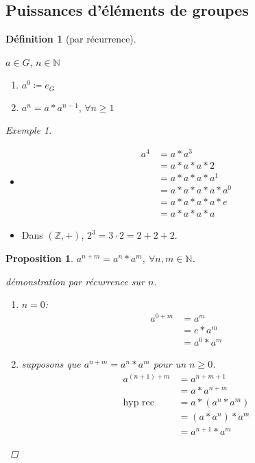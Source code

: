 \documentclass{report}
\newcommand*{\entiers}{\mathbb{Z}}
\newcommand*{\naturels}{\mathbb{N}}
\newtheorem*{prop}{Proposition}
\theoremstyle{definition}
\newtheorem*{defin}{D\'efinition}
\theoremstyle{remark}
\newtheorem*{exem}{Exemple}
\begin{document}
	\subsection{Puissances d'\'el\'ements de groupes}
	\begin{defin}[par r\'ecurrence]~

		$a \in G$, $n \in \naturels$
		\begin{enumerate}
			\item $a^0 \coloneq e_G$
			\item $a^n=a*a^{n-1}$, $\forall n \geq 1$
		\end{enumerate}
	\end{defin}
	\begin{exem}~

		\begin{itemize}
			\item \begin{align*}
				a^4&= a*a^3\\
				&= a*a*a*2\\
				&= a*a*a*a^1\\
				&= a*a*a*a*a^0\\
				&= a*a*a*a*e\\
				&= a*a*a*a
			\end{align*}
			\item Dans $(\entiers,+)$, $2^3=3 \cdot 2=2+2+2$.
		\end{itemize}
	\end{exem}
	\begin{prop}
		$a^{n+m}=a^n*a^m$, $\forall n,m \in \naturels$.
		\begin{proof}[d\'emonstration par r\'ecurrence sur $n$]~

			\begin{enumerate}
				\item $n=0$:
				\begin{align*}
					a^{0+m}&= a^m\\
					&= e*a^m\\
					&= a^0*a^m
				\end{align*}
				\item supposons que $a^{n+m}=a^n*a^m$ pour un $n \geq 0$.
				\begin{align*}
					a^{(n+1)+m}&= a^{n+m+1}\\
					&= a*a^{n+m}\\
					\text{hyp rec}&= a*(a^n*a^m)\\
					&= (a*a^n)*a^m\\
					&= a^{n+1}*a^m
				\end{align*}
			\end{enumerate}
		\end{proof}
	\end{prop}
\end{document}
